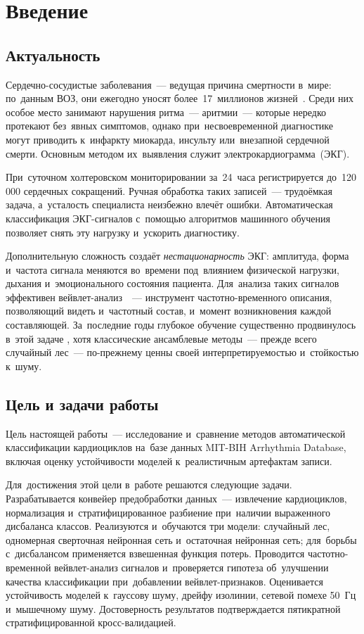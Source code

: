 \section{Введение}
\label{sec:Chapter0}

\subsection*{Актуальность}

Сердечно-сосудистые заболевания~--- ведущая причина смертности в~мире:
по~данным ВОЗ, они ежегодно уносят более~17~миллионов жизней~\cite{who2021}.
Среди них особое место занимают нарушения ритма~--- аритмии~--- которые нередко
протекают без~явных симптомов, однако при~несвоевременной диагностике могут
приводить к~инфаркту миокарда, инсульту или~внезапной сердечной смерти.
Основным методом их~выявления служит электрокардиограмма~(ЭКГ).

При~суточном холтеровском мониторировании за~24~часа регистрируется до~120\,000
сердечных сокращений.
Ручная обработка таких записей~--- трудоёмкая задача, а~усталость специалиста
неизбежно влечёт ошибки.
Автоматическая классификация ЭКГ-сигналов с~помощью алгоритмов машинного обучения
позволяет снять эту нагрузку и~ускорить диагностику.

Дополнительную сложность создаёт \textit{нестационарность} ЭКГ: амплитуда,
форма и~частота сигнала меняются во~времени под~влиянием физической нагрузки,
дыхания и~эмоционального состояния пациента.
Для~анализа таких сигналов эффективен вейвлет-анализ~\cite{zakharova2018}~---
инструмент частотно-временного описания, позволяющий видеть
и~частотный состав, и~момент возникновения каждой составляющей.
За~последние годы глубокое обучение существенно продвинулось в~этой задаче
\cite{hannun2019}, хотя классические ансамблевые методы~--- прежде всего
случайный лес~--- по-прежнему ценны своей интерпретируемостью и~стойкостью к~шуму.

\subsection*{Цель и задачи работы}

Цель настоящей работы~--- исследование и~сравнение методов автоматической
классификации кардиоциклов на~базе данных MIT-BIH Arrhythmia Database, включая
оценку устойчивости моделей к~реалистичным артефактам записи.

Для~достижения этой цели в~работе решаются следующие задачи.
Разрабатывается конвейер предобработки данных~--- извлечение кардиоциклов,
нормализация и~стратифицированное разбиение при~наличии выраженного дисбаланса
классов.
Реализуются и~обучаются три модели: случайный лес, одномерная сверточная
нейронная сеть и~остаточная нейронная сеть; для~борьбы с~дисбалансом применяется
взвешенная функция потерь.
Проводится частотно-временной вейвлет-анализ сигналов и~проверяется гипотеза
об~улучшении качества классификации при~добавлении вейвлет-признаков.
Оценивается устойчивость моделей к~гауссову шуму, дрейфу изолинии, сетевой помехе
50~Гц и~мышечному шуму.
Достоверность результатов подтверждается пятикратной стратифицированной
кросс-валидацией.

